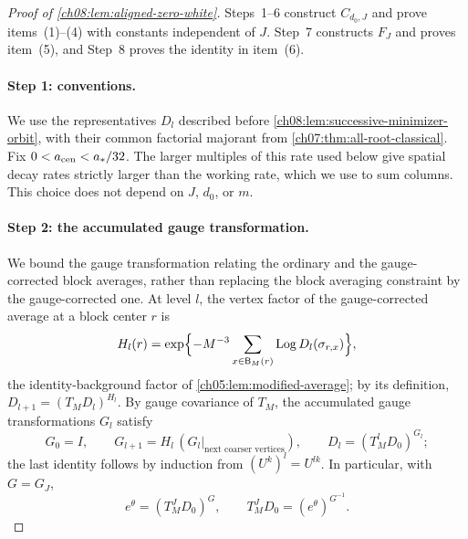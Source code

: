 \begin{proof}[Proof of \cref{ch08:lem:aligned-zero-white}]
Steps~1--6 construct $C_{d_0,J}$ and prove items~(1)--(4) with constants independent of $J$. Step~7 constructs $F_J$ and proves item~(5), and Step~8 proves the identity in item~(6).

\paragraph{Step 1: conventions.}
We use the representatives $D_l$ described before \cref{ch08:lem:successive-minimizer-orbit}, with their common factorial majorant from \cref{ch07:thm:all-root-classical}. Fix $0<a_{\rm cen}<a_*/32$. The larger multiples of this rate used below give spatial decay rates strictly larger than the working rate, which we use to sum columns. This choice does not depend on $J$, $d_0$, or $m$.

\paragraph{Step 2: the accumulated gauge transformation.}
We bound the gauge transformation relating the ordinary and the gauge-corrected block averages, rather than replacing the block averaging constraint by the gauge-corrected one. At level $l$, the vertex factor of the gauge-corrected average at a block center $r$ is
\[
 H_l(r)=\exp\Bigl\{-M^{-3}
       \sum_{x\in\mathsf B_M(r)}\operatorname{Log} D_l(\sigma_{r,x})\Bigr\},
\]
the identity-background factor of \cref{ch05:lem:modified-average}; by its definition, $D_{l+1}=(T_MD_l)^{H_l}$. By gauge covariance of $T_M$, the accumulated gauge transformations $G_l$ satisfy
\[
 G_0=I,\qquad G_{l+1}=H_l\,(G_l|_{\text{next coarser vertices}}),\qquad
 D_l=(T_M^lD_0)^{G_l};
\]
the last identity follows by induction from $(U^k)^l=U^{lk}$. In particular, with $G=G_J$,
\begin{equation}\label{ch08:eq:remaining-gauge}
 e^\theta=(T_M^JD_0)^G,\qquad
                   T_M^JD_0=(e^\theta)^{G^{-1}}.
\end{equation}


\end{proof}

